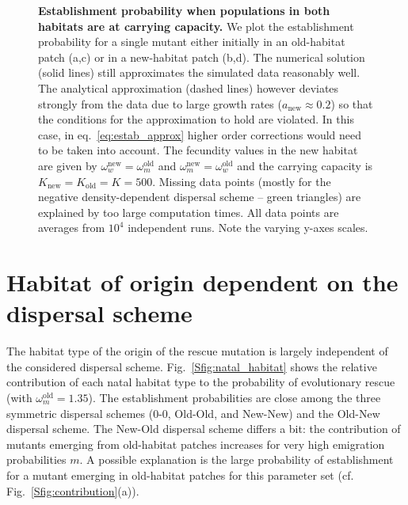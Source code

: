 \documentclass[11pt]{article}
\newcommand{\chg}[1]{\textcolor{change}{#1}}
\begin{document}
\begin{figure}[h]
	\caption{\textbf{Establishment probability when populations in both habitats are at carrying capacity.} We plot the establishment probability for a single mutant either initially in an old-habitat patch (a,c) or in a new-habitat patch (b,d). The numerical solution (solid lines) still approximates the simulated data reasonably well. The analytical approximation (dashed lines) however deviates strongly from the data due to large growth rates ($a_{\text{new}}\approx 0.2$) so that the conditions for the approximation to hold are violated. In this case, in eq.~\eqref{eq:estab_approx} higher order corrections would need to be taken into account. \chg{The fecundity values in the new habitat are given by $\omega_w^{\text{new}} = \omega_m^{\text{old}}$ and $\omega_m^{\text{new}} = \omega_w^{\text{old}}$ and the carrying capacity is $K_{\text{new}}=K_{\text{old}}=K=500$.} Missing data points (mostly for the negative density-dependent dispersal scheme -- green triangles) are explained by too large computation times. All data points are averages from $10^4$ independent runs. Note the varying y-axes scales.}
	\label{Sfig:pop_gen}
\end{figure}


\newpage
\renewcommand{\theequation}{F\arabic{equation}}
\setcounter{equation}{0}  %
\section{Habitat of origin dependent on the dispersal scheme}
The habitat type of the origin of the rescue mutation is largely independent of the considered dispersal scheme. Fig.~\ref{Sfig:natal_habitat} shows the relative contribution of each natal habitat type to the probability of evolutionary rescue (with $\omega^\text{old}_m=1.35$). The establishment probabilities are close among the three symmetric dispersal schemes (0-0, Old-Old, and New-New) and the Old-New dispersal scheme. The New-Old dispersal scheme differs a bit: the contribution of mutants emerging from old-habitat patches increases for very high emigration probabilities $m$. A possible explanation is the large probability of establishment for a mutant emerging in old-habitat patches for this parameter set (cf. Fig.~\ref{Sfig:contribution}(a)).
\end{document}
